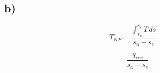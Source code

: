 

\subsection*{b)}

\[
T_{KF} = \frac{\int_{s_a}^{s_e} T \, ds}{s_a - s_e}
\]

\[
= \frac{q_{rev}}{s_a - s_e}
\]